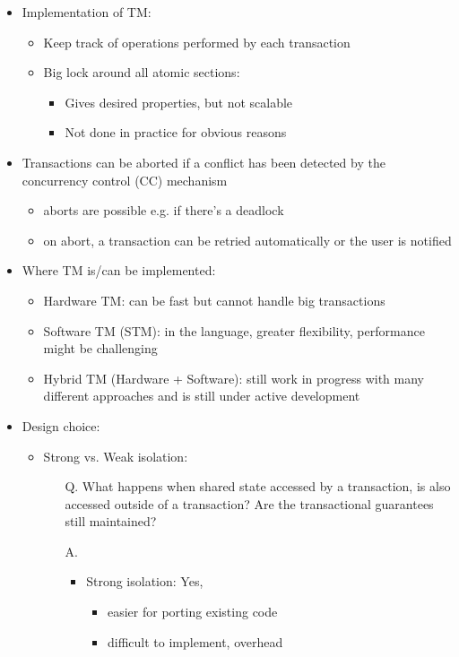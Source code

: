 \documentclass[a4paper]{article}
\begin{document}
\begin{itemize}
\item Implementation of TM:
\begin{itemize}
\item Keep track of operations performed by each transaction
\item Big lock around all atomic sections:
\begin{itemize}
\item Gives desired properties, but not scalable
\item Not done in practice for obvious reasons
\end{itemize}
\end{itemize}
\item Transactions can be aborted if a conflict has been detected by the concurrency control (CC) mechanism 
\begin{itemize}
\item aborts are possible e.g. if there’s a deadlock
\item on abort, a transaction can be retried automatically or the user is notified
\end{itemize}
\item Where TM is/can be implemented: 
\begin{itemize}
\item Hardware TM: can be fast but cannot handle big transactions
\item Software TM (STM): in the language, greater flexibility, performance might be challenging
\item Hybrid TM (Hardware + Software): still work in progress with many different approaches and is still under active development
\end{itemize}
\item Design choice: 
\begin{itemize}
\item Strong vs. Weak isolation:
\begin{enumerate}
\item[Q.] What happens when shared state accessed by a transaction, is also accessed outside of a transaction? Are the transactional guarantees still maintained? 
\item[A.]
\begin{itemize}
\item Strong isolation: Yes, 
\begin{itemize}
\item easier for porting existing code
\item difficult to implement, overhead
\end{itemize}

\end{itemize}
\end{enumerate}
\end{itemize}
\end{itemize}
\end{document}
